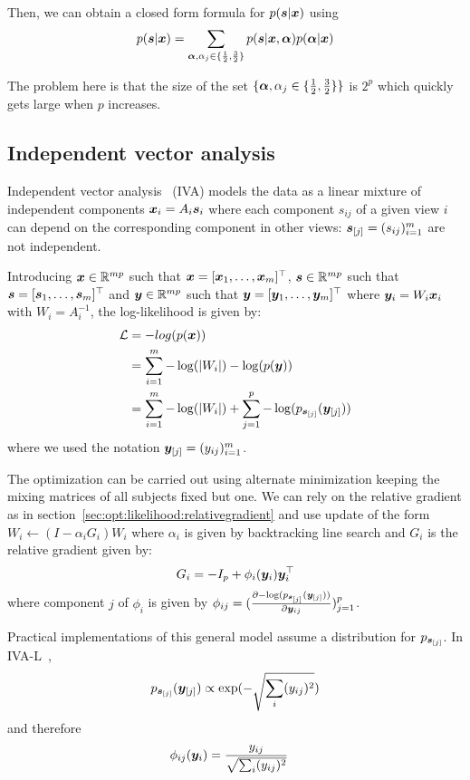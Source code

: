 Then, we can obtain a closed form formula for $p(\sbb | \xb)$ using
\begin{align}
  p(\sbb | \xb) = \sum_{\alphab, \alpha_j \in \{\frac12, \frac32\}} p(\sbb | \xb, \alphab) p(\alphab | \xb)
\end{align}

The problem here is that the size of the set $\{\alphab, \alpha_j \in
  \{\frac12, \frac32\} \}$ is $2^p$ which quickly gets large when $p$ increases.

\subsection{Independent vector analysis}
\label{sec:IVA}
Independent vector analysis~\cite{lee2008independent} (IVA) models the data as a
linear mixture of independent components $\xb_i = A_i \sbb_i$ where each
component $s_{ij}$ of a given view $i$ can depend on the corresponding component
in other views: $\sbb_{[j]} = (s_{ij})_{i=1}^m$ are not independent.

Introducing $\xb \in \RR^{mp}$ such that $\xb  = [\xb_1, \dots, \xb_m]^{\top}$,
$\sbb \in \RR^{mp}$ such that $\sbb = [\sbb_1, \dots, \sbb_m]^{\top}$ and $\yb
\in \RR^{mp}$ such that $\yb = [\yb_1, \dots, \yb_m]^{\top}$ where $\yb_i = W_i
\xb_i$ with $W_i = A_i^{-1}$, the
log-likelihood is given by:
\begin{align*}
  \loss &= - log(p(\xb)) \\
        &= \sum_{i=1}^m -\log(|W_i|) -\log(p(\yb)) \\
        &= \sum_{i=1}^m - \log(|W_i|) + \sum_{j=1}^p -\log(p_{\sbb_{[j]}}(\yb_{[j]}))
\end{align*}
where we used the notation $\yb_{[j]} = (y_{ij})_{i=1}^m$.

The optimization can be carried out using alternate minimization keeping the
mixing matrices of all subjects fixed but one. We can rely on the relative
gradient as in section~\ref{sec:opt:likelihood:relativegradient} and use update
of the form $W_i \leftarrow (I - \alpha_i G_i) W_i$ where $\alpha_i$ is given by
backtracking line search and $G_i$ is the relative gradient given by:
\begin{align}
  G_i = -I_p + \phi_i(\yb_i) \yb_i^{\top}
\end{align}
where component $j$ of $\phi_i$ is given by $\phi_{ij} = (\partialfrac{\yb_{ij}}{-\log(p_{\sbb_{[j]}}(\yb_{[j]}))})_{j=1}^p$.


Practical implementations of this general model assume a distribution for
$p_{\sbb_{[j]}}$.
In IVA-L~\cite{lee2008independent},
\begin{align}
  p_{\sbb_{[j]}}(\yb_{[j]}) \propto \exp(-\sqrt{\sum_i (y_{ij})^2})
\end{align}
and therefore
\begin{align}
  \phi_{ij}(\yb_i) &= \frac{y_{ij}}{\sqrt{\sum_i (y_{ij})^2}}
\end{align}

